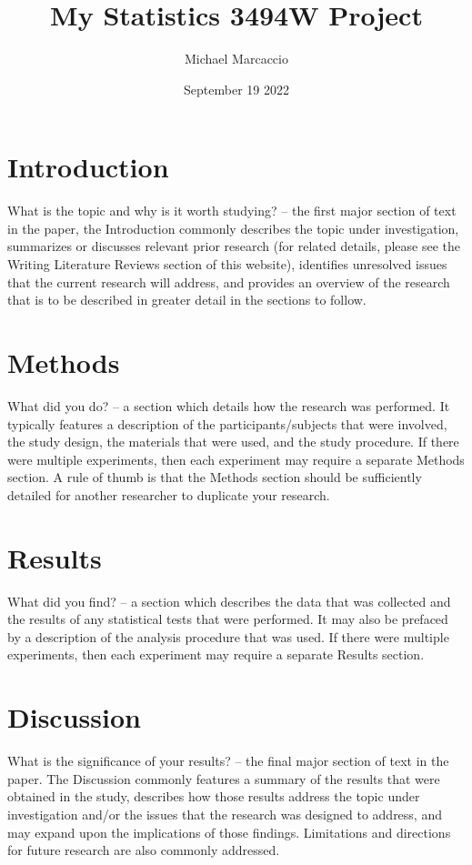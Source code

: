 \documentclass[12pt]{article}
\title{My Statistics 3494W Project}
\author{Michael  Marcaccio}
\date{September 19 2022}
\begin{document}
\maketitle

\section*{Introduction}
What is the topic and why is it worth studying? – the first major section of text in the paper, the Introduction commonly describes the topic under investigation, summarizes or discusses relevant prior research (for related details, please see the Writing Literature Reviews section of this website), identifies unresolved issues that the current research will address, and provides an overview of the research that is to be described in greater detail in the sections to follow.

\section*{Methods}
What did you do? – a section which details how the research was performed.  It typically features a description of the participants/subjects that were involved, the study design, the materials that were used, and the study procedure.  If there were multiple experiments, then each experiment may require a separate Methods section.  A rule of thumb is that the Methods section should be sufficiently detailed for another researcher to duplicate your research.

\section*{Results}
What did you find? – a section which describes the data that was collected and the results of any statistical tests that were performed.  It may also be prefaced by a description of the analysis procedure that was used. If there were multiple experiments, then each experiment may require a separate Results section.

\section*{Discussion}
What is the significance of your results? – the final major section of text in the paper.  The Discussion commonly features a summary of the results that were obtained in the study, describes how those results address the topic under investigation and/or the issues that the research was designed to address, and may expand upon the implications of those findings.  Limitations and directions for future research are also commonly addressed.
\end{document}

